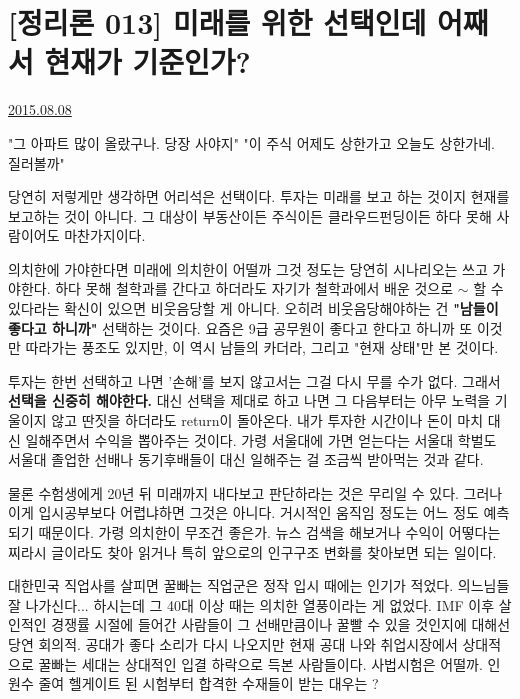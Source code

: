\section{[정리론 013] 미래를 위한 선택인데 어째서 현재가 기준인가?}
\href{https://www.kockoc.com/Apoc/236333}{2015.08.08}

\vspace{5mm}

"그 아파트 많이 올랐구나. 당장 사야지"
"이 주식 어제도 상한가고 오늘도 상한가네. 질러볼까"
\vspace{5mm}

당연히 저렇게만 생각하면 어리석은 선택이다.
투자는 미래를 보고 하는 것이지 현재를 보고하는 것이 아니다.
그 대상이 부동산이든 주식이든 클라우드펀딩이든 하다 못해 사람이어도 마찬가지이다.
\vspace{5mm}

의치한에 가야한다면 미래에 의치한이 어떨까 그것 정도는 당연히 시나리오는 쓰고 가야한다.
하다 못해 철학과를 간다고 하더라도 자기가 철학과에서 배운 것으로 $\sim$ 할 수 있다라는 확신이 있으면 비웃음당할 게 아니다.
오히려 비웃음당해야하는 건 \textbf{"남들이 좋다고 하니까"} 선택하는 것이다.
요즘은 9급 공무원이 좋다고 한다고 하니까 또 이것만 따라가는 풍조도 있지만, 이 역시 남들의 카더라, 그리고 "현재 상태"만 본 것이다.
\vspace{5mm}

투자는 한번 선택하고 나면 '손해'를 보지 않고서는 그걸 다시 무를 수가 없다.
그래서 \textbf{선택을 신중히 해야한다.}
대신 선택을 제대로 하고 나면 그 다음부터는 아무 노력을 기울이지 않고 딴짓을 하더라도 return이 돌아온다.
내가 투자한 시간이나 돈이 마치 대신 일해주면서 수익을 뽑아주는 것이다.
가령 서울대에 가면 얻는다는 서울대 학벌도 서울대 졸업한 선배나 동기후배들이 대신 일해주는 걸 조금씩 받아먹는 것과 같다.
\vspace{5mm}

물론 수험생에게 20년 뒤 미래까지 내다보고 판단하라는 것은 무리일 수 있다.
그러나 이게 입시공부보다 어렵냐하면 그것은 아니다.
거시적인 움직임 정도는 어느 정도 예측되기 때문이다.
가령 의치한이 무조건 좋은가. 뉴스 검색을 해보거나 수익이 어떻다는 찌라시 글이라도 찾아 읽거나
특히 앞으로의 인구구조 변화를 찾아보면 되는 일이다.
\vspace{5mm}

대한민국 직업사를 살피면 꿀빠는 직업군은 정작 입시 때에는 인기가 적었다.
의느님들 잘 나가신다... 하시는데 그 40대 이상 때는 의치한 열풍이라는 게 없었다.
IMF 이후 살인적인 경쟁률 시절에 들어간 사람들이 그 선배만큼이나 꿀빨 수 있을 것인지에 대해선 당연 회의적.
공대가 좋다 소리가 다시 나오지만 현재 공대 나와 취업시장에서 상대적으로 꿀빠는 세대는 상대적인 입결 하락으로 득본 사람들이다.
사법시험은 어떨까. 인원수 줄여 헬게이트 된 시험부터 합격한 수재들이 받는 대우는 ?
\vspace{5mm}

